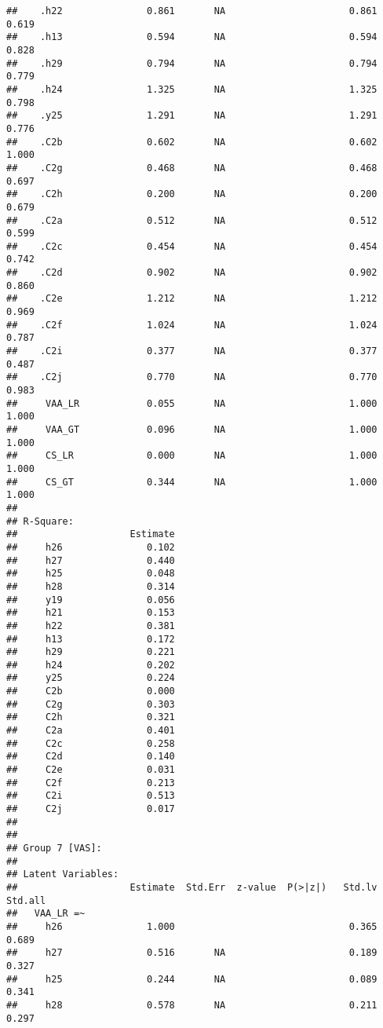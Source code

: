 \documentclass[
]{article}
\begin{document}
\begin{verbatim}
##    .h22               0.861       NA                      0.861    0.619
##    .h13               0.594       NA                      0.594    0.828
##    .h29               0.794       NA                      0.794    0.779
##    .h24               1.325       NA                      1.325    0.798
##    .y25               1.291       NA                      1.291    0.776
##    .C2b               0.602       NA                      0.602    1.000
##    .C2g               0.468       NA                      0.468    0.697
##    .C2h               0.200       NA                      0.200    0.679
##    .C2a               0.512       NA                      0.512    0.599
##    .C2c               0.454       NA                      0.454    0.742
##    .C2d               0.902       NA                      0.902    0.860
##    .C2e               1.212       NA                      1.212    0.969
##    .C2f               1.024       NA                      1.024    0.787
##    .C2i               0.377       NA                      0.377    0.487
##    .C2j               0.770       NA                      0.770    0.983
##     VAA_LR            0.055       NA                      1.000    1.000
##     VAA_GT            0.096       NA                      1.000    1.000
##     CS_LR             0.000       NA                      1.000    1.000
##     CS_GT             0.344       NA                      1.000    1.000
## 
## R-Square:
##                    Estimate
##     h26               0.102
##     h27               0.440
##     h25               0.048
##     h28               0.314
##     y19               0.056
##     h21               0.153
##     h22               0.381
##     h13               0.172
##     h29               0.221
##     h24               0.202
##     y25               0.224
##     C2b               0.000
##     C2g               0.303
##     C2h               0.321
##     C2a               0.401
##     C2c               0.258
##     C2d               0.140
##     C2e               0.031
##     C2f               0.213
##     C2i               0.513
##     C2j               0.017
## 
## 
## Group 7 [VAS]:
## 
## Latent Variables:
##                    Estimate  Std.Err  z-value  P(>|z|)   Std.lv  Std.all
##   VAA_LR =~                                                             
##     h26               1.000                               0.365    0.689
##     h27               0.516       NA                      0.189    0.327
##     h25               0.244       NA                      0.089    0.341
##     h28               0.578       NA                      0.211    0.297

\end{verbatim}
\end{document}
